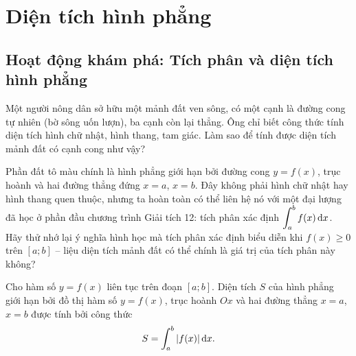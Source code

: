 \section{Diện tích hình phẳng}

\subsection{Hoạt động khám phá: Tích phân và diện tích hình phẳng}

\begin{hopkhampha}
Một người nông dân sở hữu một mảnh đất ven sông, có một cạnh là đường cong tự nhiên (bờ sông uốn lượn), ba cạnh còn lại thẳng. Ông chỉ biết công thức tính diện tích hình chữ nhật, hình thang, tam giác. Làm sao để tính được diện tích mảnh đất có cạnh cong như vậy?
\end{hopkhampha}

\begin{center}
\end{center}

\begin{hopgoiy}
Phần đất tô màu chính là hình phẳng giới hạn bởi đường cong $y=f(x)$, trục hoành và hai đường thẳng đứng $x=a$, $x=b$. Đây không phải hình chữ nhật hay hình thang quen thuộc, nhưng ta hoàn toàn có thể liên hệ nó với một đại lượng đã học ở phần đầu chương trình Giải tích 12: tích phân xác định $\displaystyle\int_a^b f(x)\,\mathrm{d}x$. Hãy thử nhớ lại ý nghĩa hình học mà tích phân xác định biểu diễn khi $f(x)\ge0$ trên $[a;b]$ -- liệu diện tích mảnh đất có thể chính là giá trị của tích phân này không?
\end{hopgoiy}

\begin{hopdinhly}[Định lý]
Cho hàm số $y=f(x)$ liên tục trên đoạn $[a;b]$. Diện tích $S$ của hình phẳng giới hạn bởi đồ thị hàm số $y=f(x)$, trục hoành $Ox$ và hai đường thẳng $x=a$, $x=b$ được tính bởi công thức
\[
S = \int_a^b |f(x)| \,\mathrm{d}x.
\]
\end{hopdinhly}

